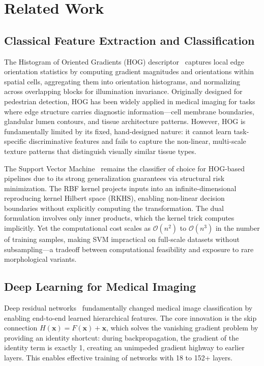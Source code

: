 \documentclass{article}
\begin{document}
\section{Related Work}
\label{sec:related}

\subsection{Classical Feature Extraction and Classification}

The Histogram of Oriented Gradients (HOG) descriptor~\citep{dalal2005histograms} captures local edge orientation statistics by computing gradient magnitudes and orientations within spatial cells, aggregating them into orientation histograms, and normalizing across overlapping blocks for illumination invariance. Originally designed for pedestrian detection, HOG has been widely applied in medical imaging for tasks where edge structure carries diagnostic information---cell membrane boundaries, glandular lumen contours, and tissue architecture patterns. However, HOG is fundamentally limited by its fixed, hand-designed nature: it cannot learn task-specific discriminative features and fails to capture the non-linear, multi-scale texture patterns that distinguish visually similar tissue types.

The Support Vector Machine~\citep{cortes1995support} remains the classifier of choice for HOG-based pipelines due to its strong generalization guarantees via structural risk minimization. The RBF kernel projects inputs into an infinite-dimensional reproducing kernel Hilbert space (RKHS), enabling non-linear decision boundaries without explicitly computing the transformation. The dual formulation involves only inner products, which the kernel trick computes implicitly. Yet the computational cost scales as $\mathcal{O}(n^2)$ to $\mathcal{O}(n^3)$ in the number of training samples, making SVM impractical on full-scale datasets without subsampling---a tradeoff between computational feasibility and exposure to rare morphological variants.

\subsection{Deep Learning for Medical Imaging}

Deep residual networks~\citep{he2016deep} fundamentally changed medical image classification by enabling end-to-end learned hierarchical features. The core innovation is the skip connection $H(\mathbf{x}) = F(\mathbf{x}) + \mathbf{x}$, which solves the vanishing gradient problem by providing an identity shortcut: during backpropagation, the gradient of the identity term is exactly 1, creating an unimpeded gradient highway to earlier layers. This enables effective training of networks with 18 to 152+ layers.
\end{document}
